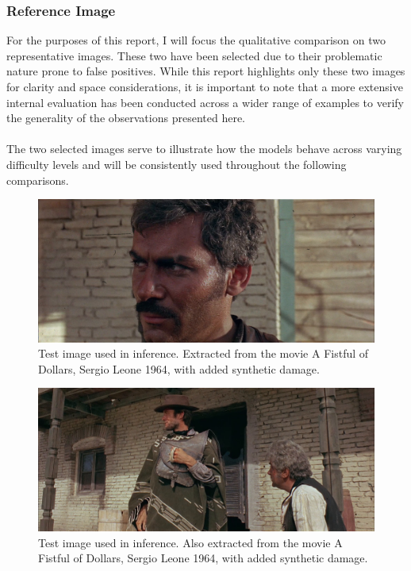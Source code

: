 \documentclass[openany, 12pt]{article}
\begin{document}
\subsubsection*{Reference Image}
For the purposes of this report, I will focus the qualitative comparison on two representative images. These two have been selected due to their problematic nature prone to false positives. While this report highlights only these two images for clarity and space considerations, it is important to note that a more extensive internal evaluation has been conducted across a wider range of examples to verify the generality of the observations presented here.\\
\\
The two selected images serve to illustrate how the models behave across varying difficulty levels and will be consistently used throughout the following comparisons.
	\begin{figure}[h!]
	\centering
	\includegraphics[width=0.8\linewidth]{images/punado_dollars_frame_0084.png}
	\caption{\smaller Test image used in inference. Extracted from the movie A Fistful of Dollars, Sergio Leone 1964, with added synthetic damage.} 
\end{figure}
	\begin{figure}[h!]
	\centering
	\includegraphics[width=0.8\linewidth]{images/punado_dollars_frame_0122.png}
	\caption{\smaller Test image used in inference. Also extracted from the movie A Fistful of Dollars, Sergio Leone 1964, with added synthetic damage.} 
\end{figure}
\newpage
\end{document}
